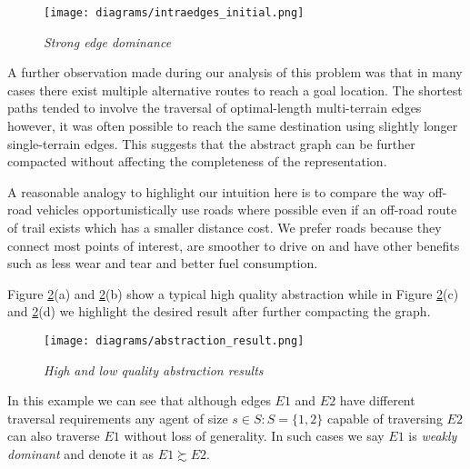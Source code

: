 \begin{figure}[htbp]
	\vspace{-9pt}
        \caption{\emph{Strong edge dominance} }
        \begin{center}
                        \texttt{[image: diagrams/intraedges\_initial.png]}
        \end{center}
        \label{aha-fig:strongdominance}
	\vspace{-6pt}
\end{figure}
A further observation made during our analysis of this problem was that in many cases there exist multiple alternative routes to reach a goal location.
The shortest paths tended to involve the traversal of optimal-length multi-terrain edges however, it was often possible to reach the same destination using slightly longer single-terrain edges.
This suggests that the abstract graph can be further compacted without affecting the completeness of the representation.
\par \indent
A reasonable analogy to highlight our intuition here is to compare the way off-road vehicles opportunistically use roads where possible even if an off-road route of trail exists which has a smaller distance cost.
We prefer roads because they connect most points of interest, are smoother to drive on and have other benefits such as less wear and tear and better fuel consumption.
\par \indent
Figure \ref{aha-fig:abstractgraph}(a) and \ref{aha-fig:abstractgraph}(b) show a typical high quality abstraction while in Figure \ref{aha-fig:abstractgraph}(c) and \ref{aha-fig:abstractgraph}(d) we highlight the desired result after further compacting the graph.
\begin{figure}[htbp]
	\vspace{-9pt}
        \caption{\emph{High and low quality abstraction results} }
        \begin{center}
                        \texttt{[image: diagrams/abstraction\_result.png]}
        \end{center}
        \label{aha-fig:abstractgraph}
	\vspace{-10pt}
\end{figure}
In this example we can see that although edges $E1$ and $E2$ have different traversal requirements any agent of size $s \in S : S = \lbrace 1, 2 \rbrace$ capable of traversing $E2$ can also traverse $E1$ without loss of generality. 
In such cases we say $E1$ is \emph{weakly dominant} and denote it as $E1 \succsim E2$. 
